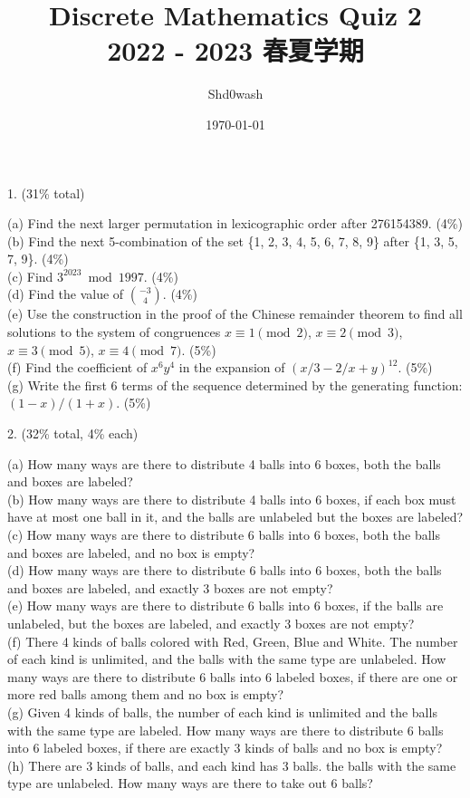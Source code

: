 \documentclass{article}
\title{Discrete Mathematics Quiz 2\\\small{2022 - 2023 春夏学期}}
\author{Shd0wash}
\date{\today}
\begin{document}
\maketitle

1. (31\% total)  

    (a) Find the next larger permutation in lexicographic order after 276154389. (4\%)\\  
    (b) Find the next 5-combination of the set \{1, 2, 3, 4, 5, 6, 7, 8, 9\} after \{1, 3, 5, 7, 9\}. (4\%)\\  
    (c) Find $3^{2023} \bmod 1997$. (4\%)  \\
    (d) Find the value of $\binom{-3}{4}$. (4\%)  \\
    (e) Use the construction in the proof of the Chinese remainder theorem to find all solutions to the system of congruences $ x \equiv 1 \pmod 2$, $x \equiv 2 \pmod 3$, $x \equiv 3 \pmod 5$, $x \equiv 4 \pmod 7$. (5\%)  \\
    (f) Find the coefficient of $x^{6}y^{4}$ in the expansion of $(x/3-2/x+y)^{12}$. (5\%)  \\
    (g) Write the first 6 terms of the sequence determined by the generating function: $(1-x)/(1+x)$. (5\%)  

2. (32\% total, 4\% each)  

    (a) How many ways are there to distribute 4 balls into 6 boxes, both the balls and boxes are labeled?  \\
    (b) How many ways are there to distribute 4 balls into 6 boxes, if each box must have at most one ball in it, and the balls are unlabeled but the boxes are labeled?  \\
    (c) How many ways are there to distribute 6 balls into 6 boxes, both the balls and boxes are labeled, and no box is empty?\\
    (d) How many ways are there to distribute 6 balls into 6 boxes, both the balls and boxes are labeled, and exactly 3 boxes are not empty?  \\
    (e) How many ways are there to distribute 6 balls into 6 boxes, if the balls are unlabeled, but the boxes are labeled, and exactly 3 boxes are not empty?  \\
    (f) There 4 kinds of balls colored with Red, Green, Blue and White. The number of each kind is unlimited, and the balls with the same type are unlabeled. How many ways are there to distribute 6 balls into 6 labeled boxes, if there are one or more red balls among them and no box is empty?  \\
    (g) Given 4 kinds of balls, the number of each kind is unlimited and the balls with the same type are labeled. How many ways are there to distribute 6 balls into 6 labeled boxes, if there are exactly 3 kinds of balls and no box is empty?  \\
    (h) There are 3 kinds of balls, and each kind has 3 balls. the balls with the same type are unlabeled. How many ways are there to take out 6 balls?  
\end{document}
